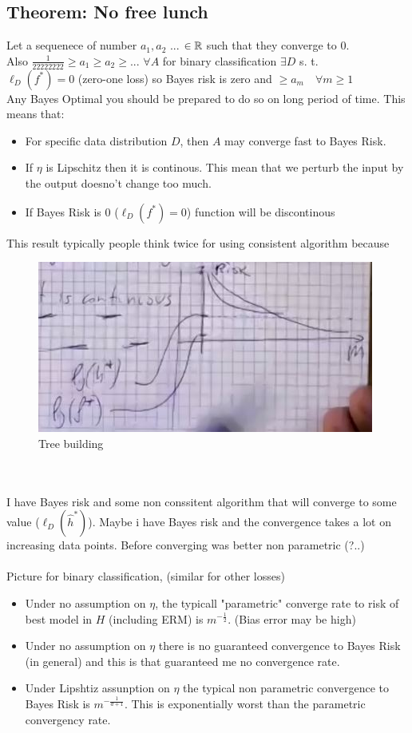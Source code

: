 \documentclass[../main.tex]{subfiles}
\begin{document}
\subsection{Theorem: No free lunch}
Let a sequenece of number 
$a_1, a_2$ ... $\in \mathbb{R} $ 
such that they converge to 0. 
\\Also $\frac{1}{22222222} \geq a_1 \geq a_2 \geq ...$ $\forall A $ 
for binary classification $\exists D$ s. t. 
\\$\ell_D(f^*) = 0 $ (zero-one loss) so Bayes risk is zero and 
 $\geq a_m \quad \forall m \geq 1$
\\
Any Bayes Optimal you should be prepared to do so on long period of time. This means that:
\begin{itemize}
\item For specific data distribution $D$, then $A$ may converge fast to Bayes Risk.
\item If $\eta$ is Lipschitz then it is continous. This mean that we perturb the input by the output doesno't change too much.
\item If Bayes Risk is 0 ($\ell_D(f^*) = 0$) function will be discontinous
\end{itemize}
This result typically people think twice for using consistent algorithm because
\begin{figure}[h]
    \centering
    \includegraphics[width=0.6\linewidth]{../img/lez12-img1.JPG}
    \caption{Tree building}
\end{figure}\\
\\
I have Bayes risk and some non conssitent algorithm that will converge to some value ($\ell_D(\hat{h}^*)$).
Maybe i have Bayes risk and the convergence takes a lot on increasing data points. Before converging was better non parametric (?..)
\\\\
Picture for binary classification, (similar for other  losses)
\begin{itemize}
\item Under no assumption on $\eta$, the typicall "parametric" converge rate to risk of best model in $H$ (including ERM) is $m^{-\frac{1}{2}}$. (Bias error may be high)
\item Under no assumption on $\eta$ there is no guaranteed convergence to Bayes Risk (in general) and this is  that guaranteed me no convergence rate.
\item Under Lipshtiz assunption on $\eta$ the typical non parametric convergence to Bayes Risk is $m^{-\frac{1}{d+1}}$. This is exponentially worst than the parametric convergency rate.
\end{itemize}
\end{document}
